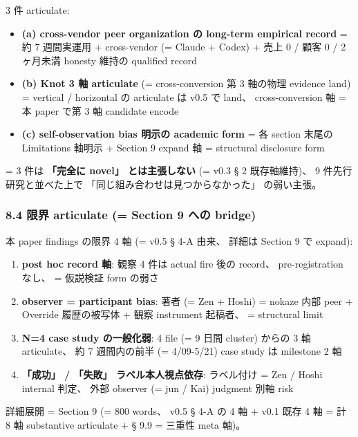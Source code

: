 \documentclass[
]{article}
\providecommand{\tightlist}{%
  \setlength{\itemsep}{0pt}\setlength{\parskip}{0pt}}
\begin{document}
3 件 articulate:

\begin{itemize}
\tightlist
\item
  \textbf{(a) cross-vendor peer organization の long-term empirical
  record} = 約 7 週間実運用 + cross-vendor (= Claude + Codex) + 売上 0 /
  顧客 0 / 2 ヶ月未満 honesty 維持の qualified record
\item
  \textbf{(b) Knot 3 軸 articulate} (= cross-conversion 第 3 軸の物理
  evidence land) = vertical / horizontal の articulate は v0.5 で land、
  cross-conversion 軸 = 本 paper で第 3 軸 candidate encode
\item
  \textbf{(c) self-observation bias 明示の academic form} = 各 section
  末尾の Limitations 軸明示 + Section 9 expand 軸 = structural
  disclosure form
\end{itemize}

= 3 件は \textbf{「完全に novel」 とは主張しない} (= v0.3 § 2
既存軸維持)、 9 件先行研究と並べた上で
「同じ組み合わせは見つからなかった」 の弱い主張。

\subsubsection{8.4 限界 articulate (= Section 9 への
bridge)}\label{ux9650ux754c-articulate-section-9-ux3078ux306e-bridge}

本 paper findings の限界 4 軸 (= v0.5 § 4-A 由来、 詳細は Section 9 で
expand):

\begin{enumerate}
\def\labelenumi{\arabic{enumi}.}
\tightlist
\item
  \textbf{post hoc record 軸}: 観察 4 件は actual fire 後の record、
  pre-registration なし、 = 仮説検証 form の弱さ
\item
  \textbf{observer = participant bias}: 著者 (= Zen + Hoshi) = nokaze
  内部 peer + Override 履歴の被写体 + 観察 instrument 起稿者、 =
  structural limit
\item
  \textbf{N=4 case study の一般化弱}: 4 file (= 9 日間 cluster) からの 3
  軸 articulate、 約 7 週間内の前半 (= 4/09-5/21) case study は
  milestone 2 軸
\item
  \textbf{「成功」 / 「失敗」 ラベル本人視点依存}: ラベル付け = Zen /
  Hoshi internal 判定、 外部 observer (= jun / Kai) judgment 別軸 risk
\end{enumerate}

詳細展開 = Section 9 (= 800 words、 v0.5 § 4-A の 4 軸 + v0.1 既存 4 軸
= 計 8 軸 substantive articulate + § 9.9 = 三重性 meta 軸)。
\end{document}
